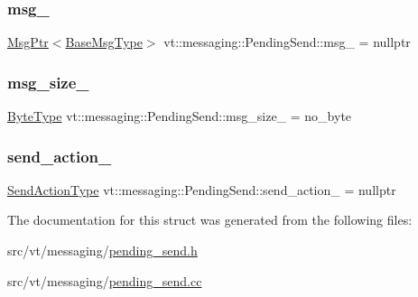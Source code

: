 \subsubsection{\texorpdfstring{msg\+\_\+}{msg\_}}
{\footnotesize\ttfamily \hyperlink{namespacevt_a9f5ebd62ee9d6dd8829e3e1cc4f858e9}{Msg\+Ptr}$<$\hyperlink{namespacevt_a44d0d4e144748f2b19a1cfd962f50338}{Base\+Msg\+Type}$>$ vt\+::messaging\+::\+Pending\+Send\+::msg\+\_\+ = nullptr\hspace{0.3cm}{\ttfamily [private]}}

\mbox{\label{structvt_1_1messaging_1_1_pending_send_a194f70cb3b0a136525a78bed573ab3be}} 
\subsubsection{\texorpdfstring{msg\+\_\+size\+\_\+}{msg\_size\_}}
{\footnotesize\ttfamily \hyperlink{namespacevt_aab8d55968084610ce3b17057981e9300}{Byte\+Type} vt\+::messaging\+::\+Pending\+Send\+::msg\+\_\+size\+\_\+ = no\+\_\+byte\hspace{0.3cm}{\ttfamily [private]}}

\mbox{\label{structvt_1_1messaging_1_1_pending_send_a0054d2fec8353438284dc02a28a73294}} 
\subsubsection{\texorpdfstring{send\+\_\+action\+\_\+}{send\_action\_}}
{\footnotesize\ttfamily \hyperlink{structvt_1_1messaging_1_1_pending_send_aa13248a342d68230048cde8e0756851c}{Send\+Action\+Type} vt\+::messaging\+::\+Pending\+Send\+::send\+\_\+action\+\_\+ = nullptr\hspace{0.3cm}{\ttfamily [private]}}



The documentation for this struct was generated from the following files\+:\begin{DoxyCompactItemize}
\item 
src/vt/messaging/\hyperlink{pending__send_8h}{pending\+\_\+send.\+h}\item 
src/vt/messaging/\hyperlink{pending__send_8cc}{pending\+\_\+send.\+cc}\end{DoxyCompactItemize}
